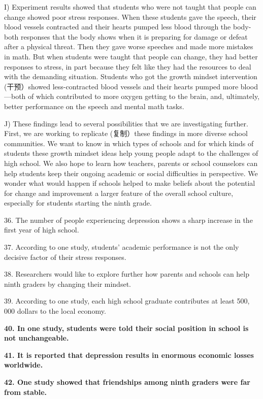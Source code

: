\documentclass[UTF8,11pt]{ctexart}
\begin{document}
I) Experiment results showed that students who were not taught that people can change showed poor stress responses. When these students gave the speech, their blood vessels contracted and their hearts pumped less blood through the body-both responses that the body shows when it is preparing for damage or defeat after a physical threat. Then they gave worse speeches and made more mistakes in math. But when students were taught that people can change, they had better responses to stress, in part because they felt like they had the resources to deal with the demanding situation. Students who got the growth mindset intervention (干预）showed less-contracted blood vessels and their hearts pumped more blood—both of which contributed to more oxygen getting to the brain, and, ultimately, better performance on the speech and mental math tasks.


J) These findings lead to several possibilities that we are investigating further. First, we are working to replicate (复制）these findings in more diverse school communities. We want to know in which types of schools and for which kinds of students these growth mindset ideas help young people adapt to the challenges of high school. We also hope to learn how teachers, parents or school counselors can help students keep their ongoing academic or social difficulties in perspective. We wonder what would happen if schools helped to make beliefs about the potential for change and improvement a larger feature of the overall school culture, especially for students starting the ninth grade.


36. The number of people experiencing depression shows a sharp increase in the first year of high school.


37. According to one study, students' academic performance is not the only decisive factor of their stress responses.


38. Researchers would like to explore further how parents and schools can help ninth graders by changing their mindset.


39. According to one study, each high school graduate contributes at least 500, 000 dollars to the local economy.


\textbf{40. In one study, students were told their social position in school is not unchangeable.}


\textbf{41. It is reported that depression results in enormous economic losses worldwide.}


\textbf{42. One study showed that friendships among ninth graders were far from stable.}
\end{document}
